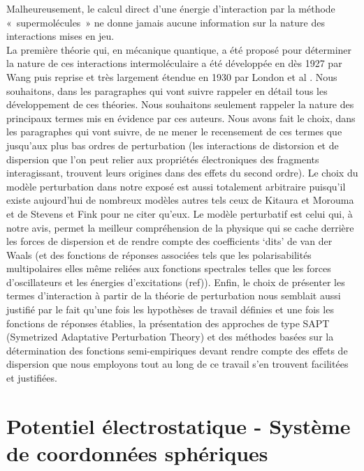 Malheureusement, le calcul direct d’une énergie d’interaction par la méthode « supermolécules » ne donne jamais aucune information sur la nature des interactions mises en jeu.\\


La première théorie qui, en mécanique quantique, a été proposé pour déterminer la nature de ces interactions intermoléculaire a été développée en dès 1927 par Wang \cite{wang1927mutual}  puis reprise et très largement étendue en 1930 par London et al \cite{london1930z}. 
Nous souhaitons, dans les paragraphes qui vont suivre rappeler en détail tous les développement de ces théories.
Nous souhaitons seulement rappeler la nature des principaux termes mis en évidence par ces auteurs. Nous avons fait le choix, dans les paragraphes qui vont suivre, de ne mener le recensement de ces termes que jusqu’aux plus bas ordres de perturbation  (les interactions de distorsion et de dispersion que l’on peut relier aux propriétés électroniques des fragments interagissant, trouvent leurs origines dans des effets du second ordre). Le choix du modèle perturbation dans notre exposé est aussi totalement arbitraire puisqu’il existe aujourd’hui de nombreux modèles autres tels ceux de  Kitaura et Morouma \cite{morokuma1977molecules} et de Stevens et Fink \cite{stevens1987frozen} pour ne citer qu’eux. Le modèle perturbatif est celui qui, à notre avis, permet la meilleur compréhension de la physique qui se cache derrière les forces de dispersion et de rendre compte des coefficients ‘dits’ de van der Waals (et des fonctions de réponses associées tels que les polarisabilités multipolaires elles même reliées aux fonctions spectrales telles que les forces d’oscillateurs et les énergies d’excitations (ref)). Enfin, le choix de présenter les termes d’interaction à partir de la théorie de perturbation nous semblait aussi justifié par le fait qu’une fois les hypothèses de travail définies et une fois les fonctions de réponses établies, la présentation des approches de type SAPT (Symetrized Adaptative Perturbation Theory) et des méthodes basées sur la détermination des fonctions semi-empiriques devant rendre compte des effets de dispersion que nous employons tout au long de ce travail s’en trouvent facilitées et justifiées.

\section[Potentiel électrostatique-Système de coordonnées]{Potentiel électrostatique - Système de coordonnées sphériques}

